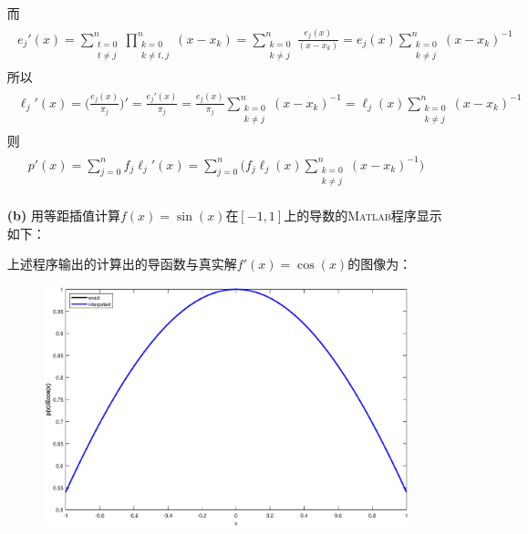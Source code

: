 \documentclass[12pt,a4paper,utf8]{ctexart}
\begin{document}
\begin{enumerate}
         而
         \begin{eqnarray}
            \begin{aligned}
               e_j'(x)=\sum_{\substack{t=0 \\ t\neq j}}^{n}\prod_{\substack{k=0\\k \neq t,j}}^{n}(x-x_k)
               =\sum_{\substack{k=0        \\k\neq j}}^{n}\frac{e_j(x)}{(x-x_k)}
               =e_j(x)\sum_{\substack{k=0  \\k\neq j}}^{n}(x-x_k)^{-1}
            \end{aligned}
         \end{eqnarray}
         所以
         \begin{eqnarray}
            \begin{aligned}
               \ell_j'(x)=\Big(\frac{e_j(x)}{\pi_j}\Big)'=\frac{e_j'(x)}{\pi_j}=
               \frac{e_j(x)}{\pi_j}\sum_{\substack{k=0 \\k\neq j}}^{n}(x-x_k)^{-1}
               =\ell_j(x)\sum_{\substack{k=0           \\k\neq j}}^{n}(x-x_k)^{-1}
            \end{aligned}
         \end{eqnarray}
         则
         \begin{eqnarray}
            \begin{aligned}
               p'(x)=\sum_{j=0}^{n}f_j\ell_j'(x)=
               \sum_{j=0}^{n}\Biggl(f_j\ell_j(x)\sum_{\substack{k=0 \\k\neq j}}^{n}(x-x_k)^{-1} \Biggr)
            \end{aligned}
         \end{eqnarray}
   \item[\textbf{(b)}]
         用等距插值计算$f(x)=\sin(x)$在$[-1,1]$上的导数的\textsc{Matlab}程序显示如下：
         
         上述程序输出的计算出的导函数与真实解$f'(x)=\cos(x)$的图像为：
         \begin{figure}[H]
            \centering
            \includegraphics[width=1\textwidth]{fig/p2b1.eps}

\end{figure}
\end{enumerate}
\end{document}
